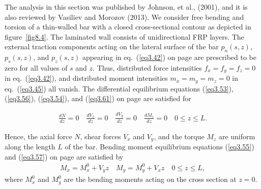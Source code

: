 \documentclass{AeroStructure-ERJohnson}
\begin{document}
The analysis in this section was published by Johnson, et al.,
(2001), and it is also reviewed by Vasiliev and Morozov (2013). We
consider free bending and torsion of a thin-walled bar with a
closed cross-sectional contour as depicted in figure~\ref{fig8.4}. The
laminated wall consists of unidirectional FRP layers. The external
traction components acting on the lateral surface of the bar
$p_{n}(s, z)$, $p_{s}(s, z)$, and $p_{z}(s, z)$ appearing in
eq.~(\ref{eq3.42}) on page \pageref{eq3.42} are prescribed to be zero for all
values of $s$ and $z$. Thus, distributed force intensities
$f_{x}=f_{y}=f_{z}=0$ in eq.~(\ref{eq3.42}), and distributed
moment intensities $m_{x}=m_{y}=m_{z}=0$ in eq.~(\ref{eq3.45}) all
vanish. The differential equilibrium equations (\ref{eq3.53}),
(\ref{eq3.56}), (\ref{eq3.54}), and (\ref{eq3.61}) on page \pageref{eq3.61} are
satisfied for


\vspace*{-30pt}

\begin{align}\label{eq8.38}
\frac{d N}{d z}=0 \quad \frac{d V_{x}}{d z}=0 \quad \frac{d
V_{y}}{d z}=0 \quad \frac{d M_{z}}{d z}=0 \quad 0 \leq z \leq L.
\end{align}

\pagebreak

\noindent Hence, the axial force $N$, shear forces $V_x$ and $V_y$, and the
torque $M_z$ are uniform along the length $L$ of the bar. Bending
moment equilibrium equations (\ref{eq3.55}) and (\ref{eq3.57}) on
page \pageref{eq3.57} are satisfied by
\begin{align}\label{eq8.39}
M_{x}=M_{x}^{0}+V_{y} z \quad M_{y}=M_{y}^{0}+V_{x} z \quad 0 \leq
z \leq L,
\end{align}
where $M_{x}^{0}$ and $M_{y}^{0}$ are the bending moments acting
on the cross section at $z=0$.
\end{document}
